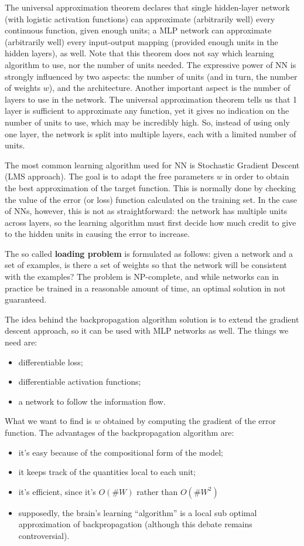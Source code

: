 The universal approximation theorem declares that single hidden-layer network (with logistic activation functions) can approximate (arbitrarily well) every continuous function, given enough units; a MLP network can approximate (arbitrarily well) every input-output mapping (provided enough units in the hidden layers), as well. Note that this theorem does not say which learning algorithm to use, nor the number of units needed. The expressive power of NN is strongly influenced by two aspects: the number of units (and in turn, the number of weights $w$), and the architecture. Another important aspect is the number of layers to use in the network. The universal approximation theorem tells us that 1 layer is sufficient to approximate any function, yet it gives no indication on the number of units to use, which may be incredibly high. So, instead of using only one layer, the network is split into multiple layers, each with a limited number of units.

The most common learning algorithm used for NN is Stochastic Gradient Descent (LMS approach). The goal is to adapt the free parameters $w$ in order to obtain the best approximation of the target function. This is normally done by checking the value of the error (or loss) function calculated on the training set. In the case of NNs, however, this is not as straightforward: the network has multiple units across layers, so the learning algorithm must first decide how much credit to give to the hidden units in causing the error to increase.

The so called \textbf{loading problem} is formulated as follows: given a network and a set of examples, is there a set of weights so that the network will be consistent with the examples? The problem is NP-complete, and while networks can in practice be trained in a reasonable amount of time, an optimal solution in not guaranteed.

The idea behind the backpropagation algorithm solution is to extend the gradient descent approach, so it can be used with MLP networks as well. The things we need are:
\begin{itemize}
    \item differentiable loss;
    \item differentiable activation functions;
    \item a network to follow the information flow.
\end{itemize}
What we want to find is $w$ obtained by computing the gradient of the error function. The advantages of the backpropagation algorithm are:
\begin{itemize}
    \item it's easy because of the compositional form of the model;
    \item it keeps track of the quantities local to each unit;
    \item it's efficient, since it's $O(\#W)$ rather than $O(\#W^2)$
    \item supposedly, the brain's learning ``algorithm'' is a local sub optimal approximation of backpropagation (although this debate remains controversial).
\end{itemize}

